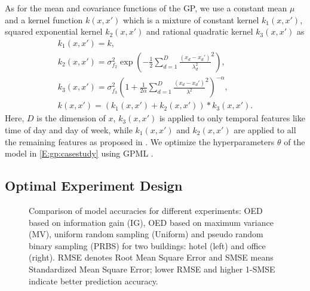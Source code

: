 As for the mean and covariance functions of the GP, %
we use a constant mean \(\mu\) and a kernel function \(k(x,x')\) which is a mixture of constant kernel \(k_1(x,x')\), squared exponential kernel \(k_2(x,x')\) and rational quadratic kernel \(k_3(x,x')\) as
\begin{gather}
k_1(x,x')  = k, \nonumber\\
k_2(x,x') = \sigma_{f_2}^2 \exp \left( -\frac{1}{2} \sum_{d=1}^D \frac{(x_d-x_d')}{{\lambda_d^2}}^2 \right),
 \nonumber\\
 k_3(x,x') = \sigma_{f_3}^2  \left( 1+ \frac{1}{2\alpha} \sum_{d=1}^D \frac{(x_d-x_d')}{{\lambda^2}}^2 \right)^{-\alpha},  \nonumber\\
k(x,x') = \left(k_1(x,x') + k_2(x,x')\right)*k_3(x,x').
\end{gather}
Here, \(D\) is the dimension of \(x\), \(k_3(x,x')\) is applied to only temporal features like time of day and day of week, while \(k_1(x,x')\) and \(k_2(x,x')\) are applied to all the remaining features as proposed in \cite{nghiemetal16gp}.
We optimize the hyperparameters \(\theta\) %
of the model in \eqref{E:gp:casestudy} using GPML \cite{Rasmussen2010}.



\subsection{Optimal Experiment Design}
\label{SS:casestudy:oed}

\begin{figure*}[t]
	\centering
	\setlength{}
	\setlength{}
	
	
	\caption{Comparison of model accuracies for different experiments: OED based on information gain (IG),  OED based on maximum variance (MV), uniform random sampling (Uniform) and pseudo random binary sampling (PRBS) for two buildings: hotel (left) and office (right). RMSE denotes Root Mean Square Error and SMSE means Standardized Mean Square Error; lower RMSE and higher 1-SMSE indicate better prediction accuracy.}
	\captionsetup{justification=centering}
	\label{F:casestudy:oed}
\end{figure*}

